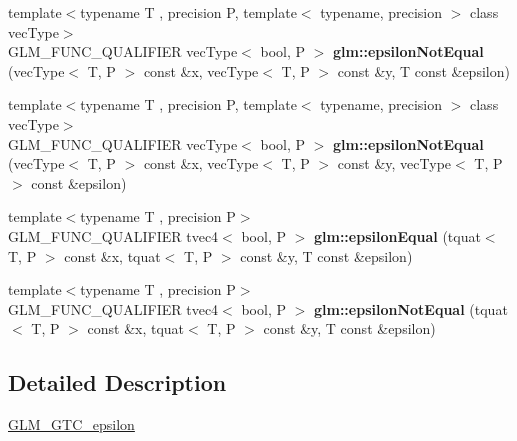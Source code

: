 \begin{DoxyCompactItemize}
\item 
\mbox{\label{epsilon_8inl_a76da74051c42eebf3256cd31464fa043}} 
{\footnotesize template$<$typename T , precision P, template$<$ typename, precision $>$ class vec\+Type$>$ }\\G\+L\+M\+\_\+\+F\+U\+N\+C\+\_\+\+Q\+U\+A\+L\+I\+F\+I\+ER vec\+Type$<$ bool, P $>$ {\bfseries glm\+::epsilon\+Not\+Equal} (vec\+Type$<$ T, P $>$ const \&x, vec\+Type$<$ T, P $>$ const \&y, T const \&epsilon)
\item 
\mbox{\label{epsilon_8inl_a34387d61360bf88bcca96b797f53e49d}} 
{\footnotesize template$<$typename T , precision P, template$<$ typename, precision $>$ class vec\+Type$>$ }\\G\+L\+M\+\_\+\+F\+U\+N\+C\+\_\+\+Q\+U\+A\+L\+I\+F\+I\+ER vec\+Type$<$ bool, P $>$ {\bfseries glm\+::epsilon\+Not\+Equal} (vec\+Type$<$ T, P $>$ const \&x, vec\+Type$<$ T, P $>$ const \&y, vec\+Type$<$ T, P $>$ const \&epsilon)
\item 
\mbox{\label{epsilon_8inl_a9573ceefb3bf8f199bd920f2a7ffa4cb}} 
{\footnotesize template$<$typename T , precision P$>$ }\\G\+L\+M\+\_\+\+F\+U\+N\+C\+\_\+\+Q\+U\+A\+L\+I\+F\+I\+ER tvec4$<$ bool, P $>$ {\bfseries glm\+::epsilon\+Equal} (tquat$<$ T, P $>$ const \&x, tquat$<$ T, P $>$ const \&y, T const \&epsilon)
\item 
\mbox{\label{epsilon_8inl_a1fcc8ab0db03be6e6c6c375b170c1f79}} 
{\footnotesize template$<$typename T , precision P$>$ }\\G\+L\+M\+\_\+\+F\+U\+N\+C\+\_\+\+Q\+U\+A\+L\+I\+F\+I\+ER tvec4$<$ bool, P $>$ {\bfseries glm\+::epsilon\+Not\+Equal} (tquat$<$ T, P $>$ const \&x, tquat$<$ T, P $>$ const \&y, T const \&epsilon)
\end{DoxyCompactItemize}


\subsection{Detailed Description}
\hyperlink{group__gtc__epsilon}{G\+L\+M\+\_\+\+G\+T\+C\+\_\+epsilon} 